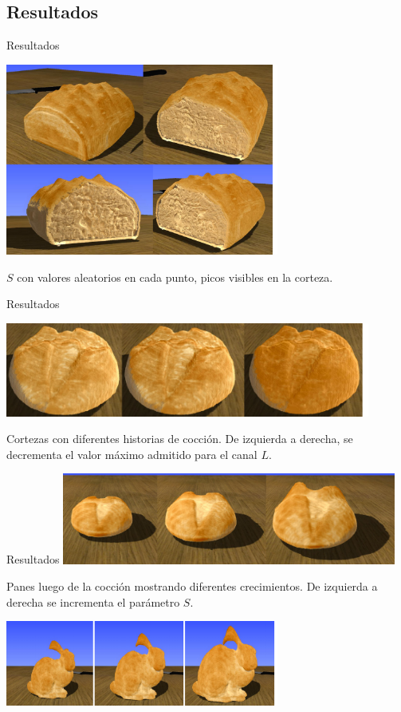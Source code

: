\documentclass[spanish]{beamer}
\begin{document}
\subsection{Resultados}

\begin{frame}{Resultados}

\centerline{\includegraphics[width=9cm]{../figures/Fig11}}

$S$ con valores aleatorios en cada punto, picos visibles en la corteza.

\end{frame}

\begin{frame}{Resultados}

\centerline{\includegraphics[width=12cm]{../figures/Fig13}}
Cortezas con diferentes historias de cocción. De izquierda a derecha, se decrementa el valor máximo admitido para el canal $L$.

\end{frame}

\begin{frame}{Resultados}
\includegraphics[width=11cm]{../figures/Fig14}

Panes luego de la cocción mostrando diferentes crecimientos. De izquierda a derecha se incrementa el parámetro $S$.

\includegraphics[width=9cm]{../figures/Fig15}


\end{frame}
\end{document}

